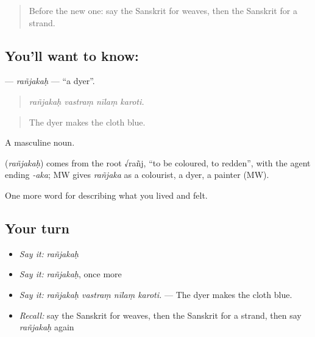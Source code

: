 \label{lesson:SA-C506-ranjakah}



\begin{quote}
Before the new one: say the Sanskrit for weaves, then the Sanskrit for a strand.
\end{quote}

\subsection*{You'll want to know: }
\textbf{} — \emph{rañjakaḥ} — \textquotedblleft{}a dyer\textquotedblright{}.

\begin{quote}
   
\end{quote}

\begin{quote}
\emph{rañjakaḥ vastraṃ nīlaṃ karoti.}
\end{quote}

\begin{quote}
The dyer makes the cloth blue.
\end{quote}

A masculine noun.

\begin{cousinweb}
\textbf{} (\emph{rañjakaḥ}) comes from the root √rañj, \textquotedblleft{}to be coloured, to redden\textquotedblright{}, with the agent ending \emph{-aka}; MW gives \emph{rañjaka} as a colourist, a dyer, a painter (MW).
\end{cousinweb}

\begin{grammarlens}[title={What you've built}]
One more word for describing what you lived and felt.
\end{grammarlens}

\subsection*{Your turn}
\begin{itemize}
\raggedright
  \item \emph{Say it:} \emph{rañjakaḥ}
  \item \emph{Say it:} \emph{rañjakaḥ}, once more
  \item \emph{Say it:} \emph{rañjakaḥ vastraṃ nīlaṃ karoti.} — The dyer makes the cloth blue.
  \item \emph{Recall:} say the Sanskrit for weaves, then the Sanskrit for a strand, then say \emph{rañjakaḥ} again
\end{itemize}

